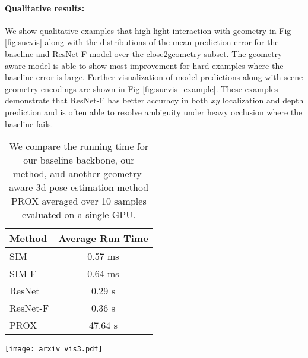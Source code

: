 \documentclass[times,referee,twocolumn,final,authoryear]{elsarticle}
\begin{document}
\paragraph{Qualitative results:} We show qualitative examples that high-light interaction
with geometry in Fig \ref{fig:sucvis} along with the distributions of the mean prediction 
error for the baseline and ResNet-F model over the close2geometry subset.  The geometry 
aware model is able to show most improvement for hard examples where the baseline error is large.
Further visualization of model predictions along with scene geometry encodings are shown in 
Fig \ref{fig:sucvis_example}. These examples demonstrate that ResNet-F has
better accuracy in both $xy$ localization and depth prediction and is often able to
resolve ambiguity under heavy occlusion where the baseline fails.

\begin{table}
\begin{center}
\small
\begin{tabular}{l|c}
\hline
 Method & Average Run Time \\
 \hline
 SIM \cite{simple} & 0.57 ms\\
\hline
 SIM-F & 0.64 ms\\
 \hline
 ResNet \cite{Zhou_2017_ICCV} & 0.29 s\\
\hline
 ResNet-F & 0.36 s\\
  \hline
PROX \cite{mpii_scene} & 47.64 s\\
\hline
\end{tabular}
\end{center}
\caption{We compare the running time for our baseline backbone, our method, and another geometry-aware 3d pose estimation method PROX \cite{mpii_scene} averaged over 10 samples evaluated on a single GPU.}
\label{table:runningtime}
\end{table}


\begin{figure*}[!bht]
\begin{center}
   \texttt{[image: arxiv\_vis3.pdf]}
\end{center}
   \caption{Visualization of the input images with the ground
   truth pose overlaid in the same view (blue and red indicate right and left sides
   respectively). Columns 2-4 depict the first 3 layers of
   multi-layer depth map. Column 5 is the baseline model prediction overlaid on the
   1st layer multi-layer depth map. Column 6 is the ResNet-F model prediction.
   The red rectangles highlight locations where the baseline model generates 
   pose predictions that violate scene geometry or are otherwise improved by
   incorporating geometric input. }
\label{fig:sucvis_example}
\end{figure*}
\end{document}
